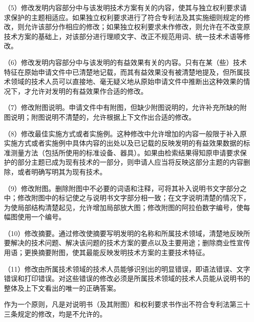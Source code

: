 {\setlength{\parindent}{17.1bp}（5）修改发明内容部分中与该发明技术方案有关的内容，使其与独立权利要求请求保护的主题相适应。如果独立权利要求进行了符合专利法及其实施细则规定的修改，则允许该部分作相应的修改；如果独立权利要求未作修改，则允许在不改变原技术方案的基础上，对该部分进行理顺文字、改正不规范用词、统一技术术语等修改。\par}

{\setlength{\parindent}{17.1bp}（6）修改发明内容部分中与该发明的有益效果有关的内容。只有在某（些）技术特征在原始申请文件中已清楚地记载，而其有益效果没有被清楚地提及，但所属技术领域的技术人员可以直接地、毫无疑义地从原始申请文件中推断出这种效果的情况下，才允许对发明的有益效果作合适的修改。\par}

{\setlength{\parindent}{17.1bp}（7）修改附图说明。申请文件中有附图，但缺少附图说明的，允许补充所缺的附图说明；附图说明不清楚的，允许根据上下文作出合适的修改。\par}

{\setlength{\parindent}{17.1bp}（8）修改最佳实施方式或者实施例。这种修改中允许增加的内容一般限于补入原实施方式或者实施例中具体内容的出处以及已记载的反映发明的有益效果数据的标准测量方法（包括所使用的标准设备、器具）。如果由检索结果得知原申请要求保护的部分主题已成为现有技术的一部分，则申请人应当将反映这部分主题的内容删除，或者明确写明其为现有技术。\par}

{\setlength{\parindent}{17.1bp}（9）修改附图。删除附图中不必要的词语和注释，可将其补入说明书文字部分之中；修改附图中的标记使之与说明书文字部分相一致；在文字说明清楚的情况下，为使局部结构清楚起见，允许增加局部放大图；修改附图的阿拉伯数字编号，使每幅图使用一个编号。\par}

{\setlength{\parindent}{17.1bp}（10）修改摘要。通过修改使摘要写明发明的名称和所属技术领域，清楚地反映所要解决的技术问题、解决该问题的技术方案的要点以及主要用途；删除商业性宣传用语；更换摘要附图，使其最能反映发明技术方案的主要技术特征。\par}

{\setlength{\parindent}{17.1bp}（11）修改由所属技术领域的技术人员能够识别出的明显错误，即语法错误、文字错误和打印错误。对这些错误的修改必须是所属技术领域的技术人员能从说明书的整体及上下文看出的唯一的正确答案。\par}

作为一个原则，凡是对说明书（及其附图）和权利要求书作出不符合专利法第三十三条规定的修改，均是不允许的。

